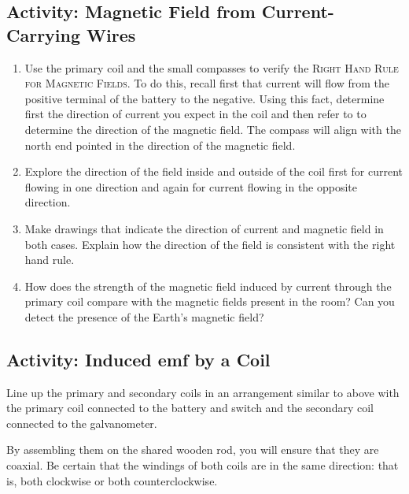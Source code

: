 \subsection{Activity: Magnetic Field from Current-Carrying Wires}
\begin{enumerate}
	 \item 	Use the primary coil and the small compasses to verify the \textsc{Right Hand Rule for Magnetic Fields}.  To do this, recall first that current will flow from the positive terminal of the battery to the negative.  Using this fact, determine first the direction of current you expect in the coil and then refer to  to determine the direction of the magnetic field.  The compass will align with the north end pointed in the direction of the magnetic field.
	 \item 	Explore the direction of the field inside and outside of the coil first for current flowing in one direction and again for current flowing in the opposite direction.
	 \item 	Make drawings that indicate the direction of current and magnetic field in both cases.  Explain how the direction of the field is consistent with the right hand rule.
	 \item How does the strength of the magnetic field induced by current through the primary coil compare with the magnetic fields present in the room?  Can you detect the presence of the Earth's magnetic field?
\end{enumerate}

\subsection{Activity: Induced emf by a Coil} \label{s:coilind}
	Line up the primary and secondary coils in an arrangement similar to  above with the primary coil connected to the battery and switch and the secondary coil connected to the galvanometer.  
	
	By assembling them on the shared wooden rod, you will ensure that they are coaxial. Be certain that the windings of both coils are in the same direction: that is, both clockwise or both counterclockwise. 
	
